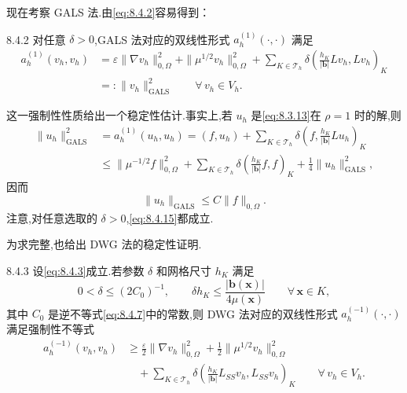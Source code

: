 现在考察 GALS 法.由\eqref{eq:8.4.2}容易得到：

\begin{proposition}[]{8.4.2}
对任意 \(\delta>0\),GALS 法对应的双线性形式 \(a_h^{(1)}(\cdot,\cdot)\) 满足
\begin{equation}\label{eq:8.4.14}
  \begin{aligned}
    a_h^{(1)}(v_h,v_h)
      &=\varepsilon\|\nabla v_h\|_{0,\Omega}^2+\|\mu^{1/2}v_h\|_{0,\Omega}^2
         +\sum_{K\in\mathcal T_h}\delta
              \left(\frac{h_K}{|\boldsymbol{b}|}Lv_h,Lv_h\right)_K\\
      &=:\|v_h\|_{\mathrm{GALS}}^2\qquad\forall\,v_h\in V_h.
  \end{aligned}
\end{equation}
\end{proposition}
这一强制性性质给出一个稳定性估计.事实上,若 \(u_h\) 是\eqref{eq:8.3.13}在 \(\rho=1\) 时的解,则
\[
  \begin{aligned}
    \|u_h\|_{\mathrm{GALS}}^2
      &=a_h^{(1)}(u_h,u_h)
        =(f,u_h)+\sum_{K\in\mathcal T_h}\delta
          \left(f,\frac{h_K}{|\boldsymbol{b}|}Lu_h\right)_K\\
      &\le\|\mu^{-1/2}f\|_{0,\Omega}^2
         +\sum_{K\in\mathcal T_h}\delta\left(\frac{h_K}{|\boldsymbol{b}|}f,f\right)_K
         +\frac14\|u_h\|_{\mathrm{GALS}}^2,
  \end{aligned}
\]
因而
\begin{equation}\label{eq:8.4.15}
  \|u_h\|_{\mathrm{GALS}}\le C\|f\|_{0,\Omega}.
\end{equation}
注意,对任意选取的 \(\delta>0\),\eqref{eq:8.4.15}都成立.

为求完整,也给出 DWG 法的稳定性证明.

\begin{proposition}[]{8.4.3}
设\eqref{eq:8.4.3}成立.若参数 \(\delta\) 和网格尺寸 \(h_K\) 满足
\[
  0<\delta\le(2C_0)^{-1},\qquad
  \delta h_K\le\frac{|\boldsymbol{b}(\boldsymbol{x})|}{4\mu(\boldsymbol{x})}\qquad\forall\,\boldsymbol{x}\in K,
\]
其中 \(C_0\) 是逆不等式\eqref{eq:8.4.7}中的常数,则 DWG 法对应的双线性形式 \(a_h^{(-1)}(\cdot,\cdot)\) 满足强制性不等式
\begin{equation}\label{eq:8.4.16}
  \begin{aligned}
    a_h^{(-1)}(v_h,v_h)
      &\ge\frac{\varepsilon}2\|\nabla v_h\|_{0,\Omega}^2
       +\frac12\|\mu^{1/2}v_h\|_{0,\Omega}^2\\
      &\quad+\sum_{K\in\mathcal T_h}\delta
             \left(\frac{h_K}{|\boldsymbol{b}|}L_{SS}v_h,L_{SS}v_h\right)_K
             \qquad\forall\,v_h\in V_h.
  \end{aligned}
\end{equation}
\end{proposition}


